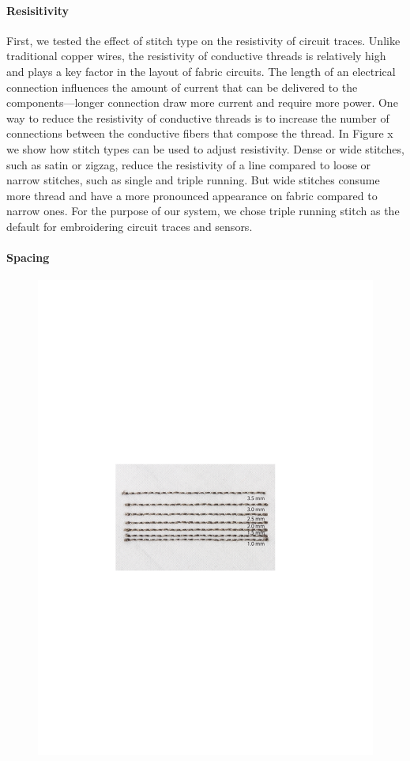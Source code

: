 \documentclass[header.tex]{subfiles}
\begin{document}
\paragraph{Resisitivity}
First, we tested the effect of stitch type on the resistivity of circuit traces. Unlike traditional copper wires, the resistivity of conductive threads is relatively high and plays a key factor in the layout of fabric circuits. The length of an electrical connection influences the amount of current that can be delivered to the components---longer connection draw more current and require more power. One way to reduce the resistivity of conductive threads is to increase the number of connections between the conductive fibers that compose the thread. In Figure x we show how stitch types can be used to adjust resistivity. Dense or wide stitches, such as satin or zigzag, reduce the resistivity of a line compared to loose or narrow stitches, such as single and triple running. But wide stitches consume more thread and have a more pronounced appearance on fabric compared to narrow ones. For the purpose of our system, we chose triple running stitch as the default for embroidering circuit traces and sensors.


\paragraph{Spacing}
 \begin{figure}
\centering
  \includegraphics[width=0.8\columnwidth]{figures/Spacing}
  \caption{}~\label{fig:Spacing}
  \vspace{-2.5em}
\end{figure}
\end{document}
